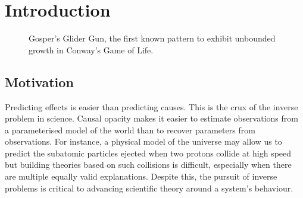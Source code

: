 \chapter{Introduction}

\begin{figure}[!h]
\centering
            \hfill
            \hfill
            \hfill
            \hfill
            \caption{Gosper's Glider Gun, the first known pattern to exhibit unbounded growth in Conway's Game of Life.\cite{hickerson}}
\label{fig:gospers-glider}
\end{figure}

\section{Motivation}
Predicting effects is easier than predicting causes. This is the crux of the inverse problem in science. Causal opacity makes it easier to estimate observations from a parameterised model of the world than to recover parameters from observations. For instance, a physical model of the universe may allow us to predict the subatomic particles ejected when two protons collide at high speed but building theories based on such collisions is difficult, especially when there are multiple equally valid explanations. Despite this, the pursuit of inverse problems is critical to advancing scientific theory around a system's behaviour.\\

